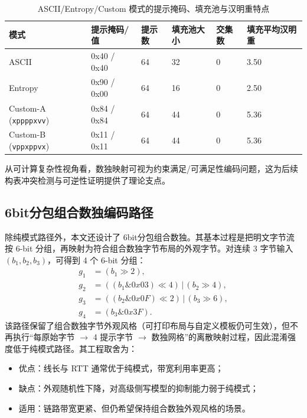\begin{table}[H]
\centering
\small
\caption{ASCII/Entropy/Custom 模式的提示掩码、填充池与汉明重特点}
\label{tab:c3-layout-char}
{\setlength{\tabcolsep}{3pt}
\begin{tabular}{p{2.6cm}p{2.0cm}p{1.4cm}p{1.8cm}p{1.4cm}p{1.8cm}}
\toprule
模式 & 提示掩码/值 & 提示数 & 填充池大小 & 交集数 & 填充平均汉明重 \\
\midrule
ASCII & 0x40 / 0x40 & 64 & 32 & 0 & 3.50 \\
Entropy & 0x90 / 0x00 & 64 & 16 & 0 & 2.50 \\
Custom-A (\texttt{xppppxvv}) & 0x84 / 0x84 & 64 & 44 & 0 & 5.36 \\
Custom-B (\texttt{vppxppvx}) & 0x11 / 0x11 & 64 & 44 & 0 & 5.36 \\
\bottomrule
\end{tabular}
}
\end{table}

从可计算复杂性视角看，数独映射可视为约束满足/可满足性编码问题\cite{lynce2006satgrid}，这为后续构表冲突检测与可逆性证明提供了理论支点。

\subsection{6bit分包组合数独编码路径}
除纯模式路径外，本文还设计了 6bit分包组合数独。其基本过程是把明文字节流按 6-bit 分组，再映射为符合组合数独字节布局的外观字节。对连续 3 字节输入 $(b_1,b_2,b_3)$，可得到 4 个 6-bit 分组：
\[
\begin{aligned}
g_1 &= (b_1\!\gg\!2),\\
g_2 &= ((b_1\&0x03)\!\ll\!4)\,|\, (b_2\!\gg\!4),\\
g_3 &= ((b_2\&0x0F)\!\ll\!2)\,|\, (b_3\!\gg\!6),\\
g_4 &= (b_3\&0x3F).
\end{aligned}
\]
该路径保留了组合数独字节外观风格（可打印布局与自定义模板仍可生效），但不再执行“每原始字节 $\rightarrow$ 4 提示字节 $\rightarrow$ 数独网格”的离散映射过程，因此混淆强度低于纯模式路径。其工程取舍为：
\begin{itemize}
  \item 优点：线长与 RTT 通常优于纯模式，带宽利用率更高；
  \item 缺点：外观随机性下降，对高级侧写模型的抑制能力弱于纯模式；
  \item 适用：链路带宽更紧、但仍希望保持组合数独外观风格的场景。
\end{itemize}

